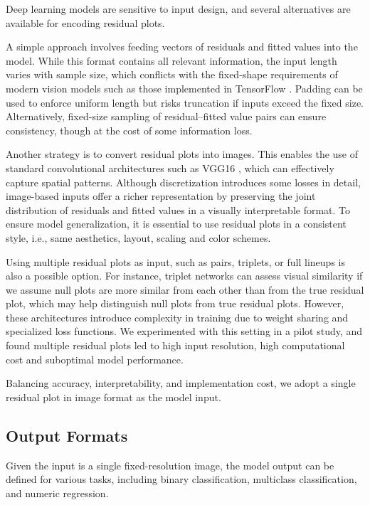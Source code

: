 \documentclass[]{interact}
\theoremstyle{plain}%
\theoremstyle{definition}
\theoremstyle{remark}
\begin{document}
Deep learning models are sensitive to input design, and several
alternatives are available for encoding residual plots.

A simple approach involves feeding vectors of residuals and fitted
values into the model. While this format contains all relevant
information, the input length varies with sample size, which conflicts
with the fixed-shape requirements of modern vision models such as those
implemented in TensorFlow \citep{abadi2016tensorflow}. Padding can be
used to enforce uniform length but risks truncation if inputs exceed the
fixed size. Alternatively, fixed-size sampling of residual--fitted value
pairs can ensure consistency, though at the cost of some information
loss.

Another strategy is to convert residual plots into images. This enables
the use of standard convolutional architectures such as VGG16
\citep{simonyan2014very}, which can effectively capture spatial
patterns. Although discretization introduces some losses in detail,
image-based inputs offer a richer representation by preserving the joint
distribution of residuals and fitted values in a visually interpretable
format. To ensure model generalization, it is essential to use residual
plots in a consistent style, i.e., same aesthetics, layout, scaling and
color schemes.

Using multiple residual plots as input, such as pairs, triplets, or full
lineups is also a possible option. For instance, triplet networks
\citep{chopra2005learning} can assess visual similarity if we assume
null plots are more similar from each other than from the true residual
plot, which may help distinguish null plots from true residual plots.
However, these architectures introduce complexity in training due to
weight sharing and specialized loss functions. We experimented with this
setting in a pilot study, and found multiple residual plots led to high
input resolution, high computational cost and suboptimal model
performance.

Balancing accuracy, interpretability, and implementation cost, we adopt
a single residual plot in image format as the model input.

\subsection{Output Formats}\label{output-formats}

Given the input is a single fixed-resolution image, the model output can
be defined for various tasks, including binary classification,
multiclass classification, and numeric regression.
\end{document}
